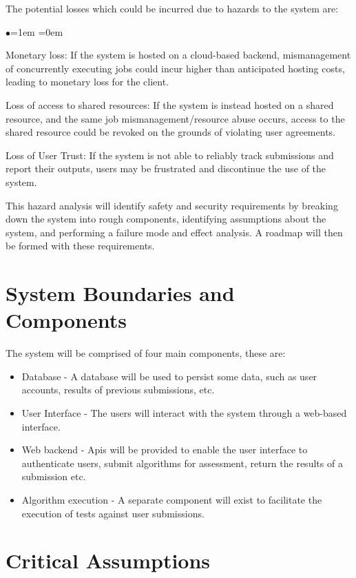\documentclass{article}
\begin{document}
The potential losses which could be incurred due to hazards to the system are:
\begin{list}{$\bullet$}{\leftmargin=1em \itemindent=0em}
            \item Monetary loss: If the system is hosted on a cloud-based backend, mismanagement of concurrently executing jobs could incur higher than anticipated hosting costs, leading to monetary loss for the client.
            \item Loss of access to shared resources: If the system is instead hosted on a shared resource, and the same job mismanagement/resource abuse occurs, access to the shared resource could be revoked on the grounds of violating user agreements.
            \item Loss of User Trust: If the system is not able to reliably track submissions and report their outputs, users may be frustrated and discontinue the use of the system. 
        \end{list}

This hazard analysis will identify safety and security requirements by breaking down the system into rough components, identifying assumptions about the system, and performing a failure mode and effect analysis. A roadmap will then be formed with these requirements. 


\section{System Boundaries and Components}

The system will be comprised of four main components, these are:

\begin{itemize}
    \item Database - A database will be used to persist some data, such as user accounts, results of previous submissions, etc.
    \item User Interface - The users will interact with the system through a web-based interface.
    \item Web backend - Apis will be provided to enable the user interface to authenticate users, submit algorithms for assessment, return the results of a submission etc.
    \item Algorithm execution - A separate component will exist to facilitate the execution of tests against user submissions.
\end{itemize}


\section{Critical Assumptions}
\end{document}
